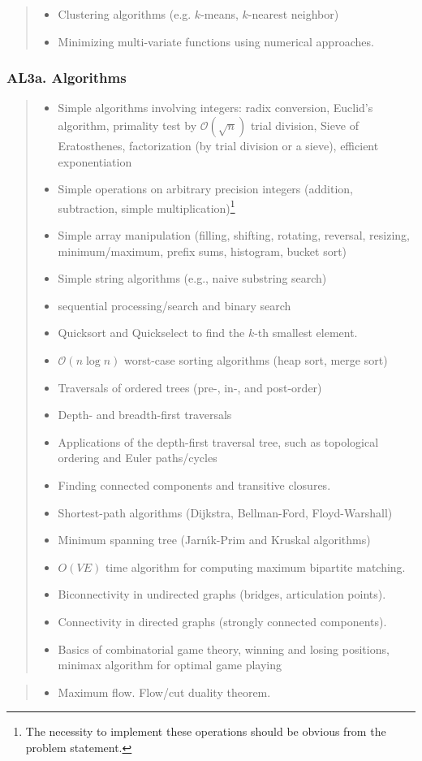 \documentclass[a4paper,11pt,oneside]{article}
\newcommand{\cmark}{\ding{51}}%
\newcommand{\xmark}{\ding{55}}%
\newcommand{\CC}[1]{#1}
\newcommand{\ccode}{{\small\cmark\faFileText}}
\newcommand{\cemay}{{\small\xmark\faQuestionCircle}}
\newcommand{\cexcl}{{\small\xmark}}
\newcommand{\Icodeonly}{\item[\hbox to 1.8em{\ccode\hfill}]}
\newcommand{\Iexmaybe}{\item[\hbox to 1.8em{\cemay\hfill}]}
\newcommand{\Iexcluded}{\item[\hbox to 1.8em{\cexcl\hfill}]}
\newenvironment{myitemize}{\begin{quote}\begin{itemize}\itemsep 0pt}{\end{itemize}\end{quote}}
\begin{document}
    \begin{myitemize}
    \Iexcluded Clustering algorithms (e.g. $k$-means, $k$-nearest neighbor)
    \Iexcluded Minimizing multi-variate functions using numerical approaches.
    \end{myitemize}
  
    \subsubsection*{AL3a. Algorithms}%

    \begin{myitemize}
    \Icodeonly Simple algorithms involving integers: radix conversion, Euclid's algorithm, primality test by $\mathcal{O}(\sqrt{n})$ trial division, Sieve of Eratosthenes, factorization (by trial division or a sieve), efficient exponentiation
    \Icodeonly Simple operations on arbitrary precision integers (addition, subtraction, simple multiplication)\footnote{The necessity to implement these operations should be obvious from the problem statement.}
    \Icodeonly Simple array manipulation (filling, shifting, rotating, reversal, resizing, minimum/maximum, prefix sums, histogram, bucket sort)
    \Icodeonly Simple string algorithms (e.g., naive substring search)
    \Icodeonly\CC{sequential} processing/search \CC{and binary search}
    \Icodeonly \CC{Quicksort} and Quickselect to find the $k$-th smallest element.
    \Icodeonly\CC{$\mathcal{O}(n \log n)$} worst-case \CC{sorting algorithms (heap sort, merge sort)}
    \Icodeonly Traversals of ordered trees (pre-, in-, and post-order)
    \Icodeonly\CC{Depth- and breadth-first traversals}
    \Icodeonly Applications of the depth-first traversal tree, such as topological ordering and Euler paths/cycles
    \Icodeonly Finding connected components and transitive closures.
    \Icodeonly Shortest-path algorithms (Dijkstra, Bellman-Ford, Floyd-Warshall)
    \Icodeonly Minimum spanning tree (Jarn\'\i k-Prim and Kruskal algorithms)
    \Icodeonly $O(VE)$ time algorithm for computing maximum bipartite matching.
    \Icodeonly Biconnectivity in undirected graphs (bridges, articulation points).
    \Icodeonly Connectivity in directed graphs (strongly connected components).
    \Icodeonly Basics of combinatorial game theory, winning and losing positions, minimax algorithm for optimal game playing
    \end{myitemize}

    \begin{myitemize}
    \Iexmaybe Maximum flow. Flow/cut duality theorem.
    \end{myitemize}
\end{document}
